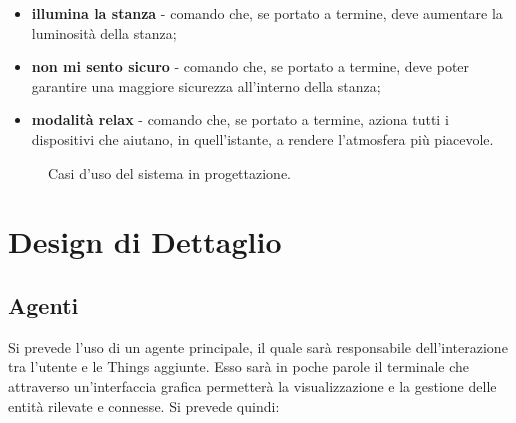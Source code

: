 \documentclass[12pt,a4paper,openright,oneside]{report}
\begin{document}
\begin{itemize}
	\item \textbf{illumina la stanza} - comando che, se portato a termine, deve aumentare la luminosità della stanza;
	\item \textbf{non mi sento sicuro} - comando che, se portato a termine, deve poter garantire una maggiore sicurezza all'interno della stanza;
	\item \textbf{modalità relax} - comando che, se portato a termine, aziona tutti i dispositivi che aiutano, in quell'istante, a rendere l'atmosfera più piacevole.
\end{itemize}

\begin{figure}[h]
	\centering
	\caption{Casi d'uso del sistema in progettazione.}
	\label{fig:use-case}
\end{figure}

\clearpage
\section{Design di Dettaglio}

\subsection{Agenti}
Si prevede l'uso di un agente principale, il quale sarà responsabile dell'interazione tra l'utente e le Things aggiunte. Esso sarà in poche parole il terminale che attraverso un'interfaccia grafica permetterà la visualizzazione e la gestione delle entità rilevate e connesse. Si prevede quindi:
\end{document}
